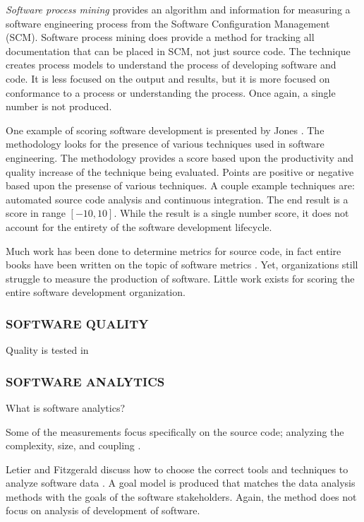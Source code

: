 \documentclass[SDSUThesis.tex]{subfiles}
\begin{document}
\textit{Software process mining} \cite{Rubin2007} provides
an algorithm and information for measuring a software engineering process from
the Software Configuration Management (SCM). Software process mining does provide a method for tracking all 
documentation that can be placed in SCM, not just source code.  The technique creates process models 
to understand the process of developing software and code. It is less focused on the output and results,
but it is more focused on conformance to a process or understanding the process. Once again, a single number is not produced.

One example of scoring software development is presented by Jones \cite{Jones2012}. The methodology looks
for the presence of various techniques used in software engineering.  The methodology provides a score based upon the 
productivity and quality increase of the technique being evaluated.  Points are positive or negative based upon the 
presense of various techniques. A couple example techniques are: 
automated source code analysis and continuous integration.  The end result is a score in range $[-10,10]$. 
While the result is a single number score, it does not account for the entirety of the software development lifecycle.

Much work has been done to determine metrics for source code, in fact 
entire books have been written on the topic of software metrics \cite{Jones1996, Putnam2013}. Yet, 
organizations still struggle to measure the production of software.
Little work exists
for scoring the entire software development organization. 

\subsubsection{SOFTWARE QUALITY}
Quality is tested in \cite{Miguel2014}

\subsubsection{SOFTWARE ANALYTICS}
What is software analytics?

Some of the measurements focus specifically on the source code; analyzing the 
complexity, size, and coupling \cite{Tosi2012}. 

Letier and Fitzgerald discuss how to choose the correct tools and techniques to analyze
software data \cite{Letier2013}.  A goal model is produced that matches the data analysis methods
with the goals of the software stakeholders.  Again, the method does not focus
on analysis of development of software.
\end{document}
